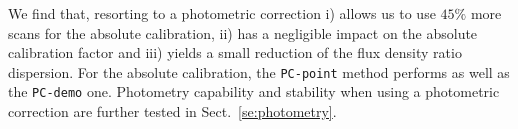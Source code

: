 We find that, resorting to a photometric correction i) allows us to use $45\%$ more
scans for the absolute calibration, ii) has a negligible impact on
the absolute calibration factor and iii) yields a small reduction of
the flux density ratio dispersion. For the absolute calibration, the
{\tt PC-point} method performs as well as the {\tt PC-demo} one.
Photometry capability and stability when using a photometric
correction are further tested in Sect.~\ref{se:photometry}.\\






